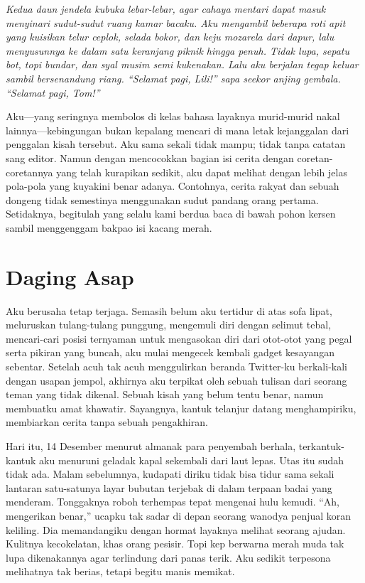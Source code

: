 \documentclass[smalldemyvopaper,11pt,twoside,onecolumn,openright,extrafontsizes]{memoir}
\begin{document}
\textit{Kedua daun jendela kubuka lebar-lebar, agar cahaya mentari dapat masuk menyinari sudut-sudut ruang kamar bacaku. Aku mengambil beberapa roti apit yang kuisikan telur ceplok, selada bokor, dan keju mozarela dari dapur, lalu menyusunnya ke dalam satu keranjang piknik hingga penuh. Tidak lupa, sepatu bot, topi bundar, dan syal musim semi kukenakan. Lalu aku berjalan tegap keluar sambil bersenandung riang. ``Selamat pagi, Lili!'' sapa seekor anjing gembala. ``Selamat pagi, Tom!''}


Aku---yang seringnya membolos di kelas bahasa layaknya murid-murid nakal lainnya---kebingungan bukan kepalang mencari di mana letak kejanggalan dari penggalan kisah tersebut. Aku sama sekali tidak mampu; tidak tanpa catatan sang editor. Namun dengan mencocokkan bagian isi cerita dengan coretan-coretannya yang telah kurapikan sedikit, aku dapat melihat dengan lebih jelas pola-pola yang kuyakini benar adanya. Contohnya, cerita rakyat dan sebuah dongeng tidak semestinya menggunakan sudut pandang orang pertama. Setidaknya, begitulah yang selalu kami berdua baca di bawah pohon kersen sambil menggenggam bakpao isi kacang merah.

\chapter{Daging Asap}

Aku berusaha tetap terjaga. Semasih belum aku tertidur di atas sofa lipat, meluruskan tulang-tulang punggung, mengemuli diri dengan selimut tebal, mencari-cari posisi ternyaman untuk mengasokan diri dari otot-otot yang pegal serta pikiran yang buncah, aku mulai mengecek kembali gadget kesayangan sebentar. Setelah acuh tak acuh menggulirkan beranda Twitter-ku berkali-kali dengan usapan jempol, akhirnya aku terpikat oleh sebuah tulisan dari seorang teman yang tidak dikenal. Sebuah kisah yang belum tentu benar, namun membuatku amat khawatir. Sayangnya, kantuk telanjur datang menghampiriku, membiarkan cerita tanpa sebuah pengakhiran.


Hari itu, 14 Desember menurut almanak para penyembah berhala, terkantuk-kantuk aku menuruni geladak kapal sekembali dari laut lepas. Utas itu sudah tidak ada. Malam sebelumnya, kudapati diriku tidak bisa tidur sama sekali lantaran satu-satunya layar bubutan terjebak di dalam terpaan badai yang menderam. Tonggaknya roboh terhempas tepat mengenai hulu kemudi. ``Ah, mengerikan benar,'' ucapku tak sadar di depan seorang wanodya penjual koran keliling. Dia memandangiku dengan hormat layaknya melihat seorang ajudan. Kulitnya kecokelatan, khas orang pesisir. Topi kep berwarna merah muda tak lupa dikenakannya agar terlindung dari panas terik. Aku sedikit terpesona melihatnya tak berias, tetapi begitu manis memikat.
\end{document}
